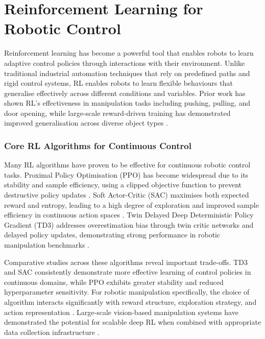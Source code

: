 \documentclass[12pt,a4paper,oneside]{report}
\begin{document}
\section{Reinforcement Learning for Robotic Control}

Reinforcement learning has become a powerful tool that enables robots to learn adaptive control policies through interactions with their environment. Unlike traditional industrial automation techniques that rely on predefined paths and rigid control systems, RL enables robots to learn flexible behaviours that generalise effectively across different conditions and variables. Prior work has shown RL's effectiveness in manipulation tasks including pushing, pulling, and door opening, while large-scale reward-driven training has demonstrated improved generalisation across diverse object types \cite{chengZeroshotSimtorealTransfer2023, palliImplementationPickandPlaceRobotic2025}.

\subsubsection{Core RL Algorithms for Continuous Control}

Many RL algorithms have proven to be effective for continuous robotic control tasks. Proximal Policy Optimisation (PPO) has become widespread due to its stability and sample efficiency, using a clipped objective function to prevent destructive policy updates \cite{schulmanProximalPolicyOptimization2017}. Soft Actor-Critic (SAC) maximises both expected reward and entropy, leading to a high degree of exploration and improved sample efficiency in continuous action spaces \cite{haarnojaSoftActorCriticOffPolicy2018b}. Twin Delayed Deep Deterministic Policy Gradient (TD3) addresses overestimation bias through twin critic networks and delayed policy updates, demonstrating strong performance in robotic manipulation benchmarks \cite{chengZeroshotSimtorealTransfer2023, wangEvaluationDDPGTD32024}.

Comparative studies across these algorithms reveal important trade-offs. TD3 and SAC consistently demonstrate more effective learning of control policies in continuous domains, while PPO exhibits greater stability and reduced hyperparameter sensitivity. For robotic manipulation specifically, the choice of algorithm interacts significantly with reward structure, exploration strategy, and action representation \cite{chengZeroshotSimtorealTransfer2023, wangEvaluationDDPGTD32024}. Large-scale vision-based manipulation systems have demonstrated the potential for scalable deep RL when combined with appropriate data collection infrastructure \cite{kalashnikovQTOptScalableDeep2018}.
\end{document}
